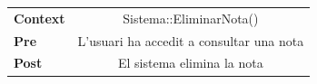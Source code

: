 \begin{itemize}
\begin{table}[!h]
\begin{tabular}{l C}
\textbf{Context}  & Sistema::EliminarNota()\\
\textbf{Pre} & L'usuari ha accedit a consultar una nota\\
\textbf{Post} & El sistema elimina la nota\\
\end{tabular}
\label{}
\end{table}

\end{itemize}
